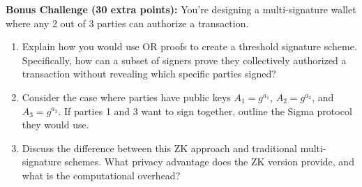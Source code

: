 \documentclass[10pt,a4paper,american]{exam}
\begin{document}
\begin{tcolorbox}[colframe=EarthBrown!30!white,colback=EarthBrown!5!white]
	\textbf{Bonus Challenge (30 extra points):} You're designing a multi-signature wallet where any 2 out of 3 parties can authorize a transaction.
	\begin{enumerate}
		\item Explain how you would use OR proofs to create a threshold signature scheme. Specifically, how can a subset of signers prove they collectively authorized a transaction without revealing which specific parties signed?
		\item Consider the case where parties have public keys $A_1 = g^{a_1}$, $A_2 = g^{a_2}$, and $A_3 = g^{a_3}$. If parties 1 and 3 want to sign together, outline the Sigma protocol they would use.
		\item Discuss the difference between this ZK approach and traditional multi-signature schemes. What privacy advantage does the ZK version provide, and what is the computational overhead?
	\end{enumerate}
\end{tcolorbox}
\end{document}
